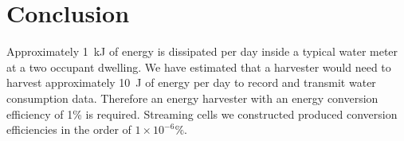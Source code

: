 \documentclass[10pt,final,journal]{IEEEtran}
\begin{document}
    \section{Conclusion}
    \label{sect:conclusion}
    Approximately \SI{1}{\kilo\joule} of energy is dissipated per day inside a typical water meter at a two occupant dwelling.
    We have estimated that a harvester would need to harvest approximately \SI{10}{\joule} of energy per day to record and transmit water consumption data.
    Therefore an energy harvester with an energy conversion efficiency of 1\% is required.
    Streaming cells we constructed produced conversion efficiencies in the order of $1\times 10^{-6}\%$.

    
    
\end{document}
